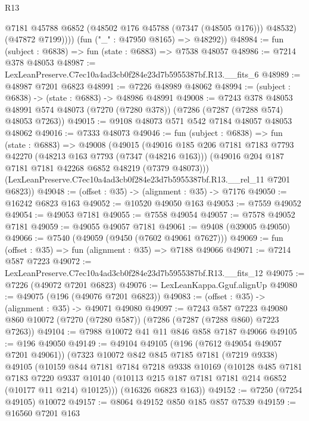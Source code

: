 \begin{lexlean}{R13}
\begin{coremodule}
              @7181
              @45788
              @6852
              (@48502 @176 @45788 (@7347 (@48505 @176)))
              @48532)
            (@47872 @7199))))
      (fun ("_" : @47950 @8165) => @48292))
@48984 := fun (subject : @6838) => fun (state : @6883) => @7538 @48057
@48986 := @7214 @378 @48053
@48987 := LexLeanPreserve.C7ec10a4ad3cb0f284e23d7b5955387bf.R13.__fits_6
@48989 := @48987 @7201 @6823
@48991 := @7226 @48989 @48062
@48994 := (subject : @6838) -> (state : @6883) -> @48986 @48991
@49008 := @7243
    @378
    @48053
    @48991
    @574
    @48073
    (@7270 (@7280 @378))
    (@7286 (@7287 (@7288 @574) @48053 @7263))
@49015 := @9108 @48073 @571 @542 @7184 @48057 @48053 @48062
@49016 := @7333 @48073
@49046 := fun (subject : @6838) =>
  fun (state : @6883) =>
  @49008
    (@49015
      (@49016
        @185
        @206
        @7181
        @7183
        @7793
        @42270
        (@48213 @163 @7793 (@7347 (@48216 @163)))
        (@49016 @204 @187 @7181 @7181 @42268 @6852 @48219 (@7379 @48073)))
      (LexLeanPreserve.C7ec10a4ad3cb0f284e23d7b5955387bf.R13.__rel_11 @7201 @6823))
@49048 := (offset : @35) -> (alignment : @35) -> @7176
@49050 := @16242 @6823 @163
@49052 := @10520 @49050 @163
@49053 := @7559 @49052
@49054 := @49053 @7181
@49055 := @7558 @49054
@49057 := @7578 @49052 @7181
@49059 := @49055 @49057 @7181
@49061 := @9408 (@39005 @49050)
@49066 := @7540 (@49059 (@9450 (@7602 @49061 @7627)))
@49069 := fun (offset : @35) => fun (alignment : @35) => @7188 @49066
@49071 := @7214 @587 @7223
@49072 := LexLeanPreserve.C7ec10a4ad3cb0f284e23d7b5955387bf.R13.__fits_12
@49075 := @7226 (@49072 @7201 @6823)
@49076 := LexLeanKappa.Gguf.alignUp
@49080 := @49075 (@196 (@49076 @7201 @6823))
@49083 := (offset : @35) -> (alignment : @35) -> @49071 @49080
@49097 := @7243
    @587
    @7223
    @49080
    @860
    @10072
    (@7270 (@7280 @587))
    (@7286 (@7287 (@7288 @860) @7223 @7263))
@49104 := @7988 @10072 @41 @11 @846 @858 @7187 @49066
@49105 := @196 @49050
@49149 := @49104
    @49105
    (@196 (@7612 @49054 @49057 @7201 @49061))
    (@7323
      @10072
      @842
      @845
      @7185
      @7181
      (@7219 @9338)
      @49105
      (@10159
        @844
        @7181
        @7184
        @7218
        @9338
        @10169
        (@10128
          @485
          @7181
          @7183
          @7220
          @9337
          @10140
          (@10113 @215 @187 @7181 @7181 @214 @6852 (@10177 @11 @214) @10125)))
      (@16326 @6823 @163))
@49152 := @7250 (@7254 @49105) @10072
@49157 := @8064 @49152 @850 @185 @857 @7539
@49159 := @16560 @7201 @163

\end{coremodule}
\end{lexlean}
